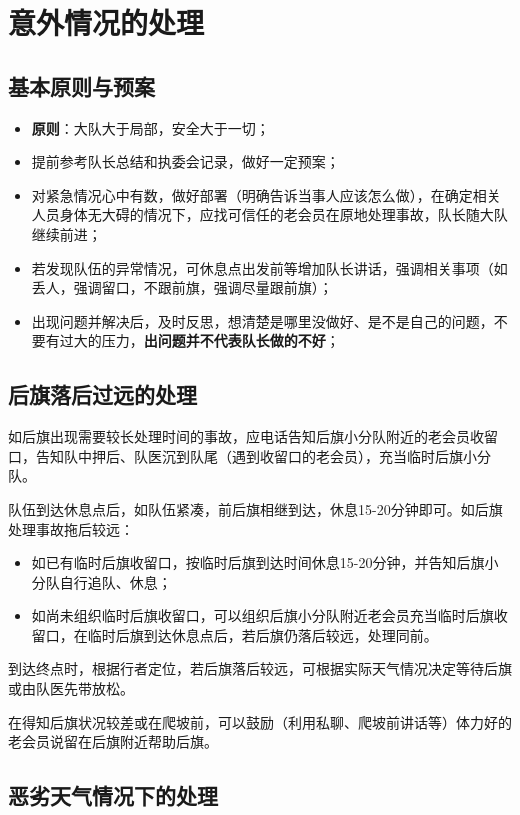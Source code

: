 \documentclass[UTF8]{ctexart}
\begin{document}
\section{意外情况的处理}


\subsection{基本原则与预案}
\begin{itemize}[nosep,left=2em]
    \item \textbf{原则}：大队大于局部，安全大于一切；
    \item 提前参考队长总结和执委会记录，做好一定预案；
    \item 对紧急情况心中有数，做好部署（明确告诉当事人应该怎么做），在确定相关人员身体无大碍的情况下，应找可信任的老会员在原地处理事故，队长随大队继续前进；
    \item 若发现队伍的异常情况，可休息点出发前等增加队长讲话，强调相关事项（如丢人，强调留口，不跟前旗，强调尽量跟前旗）；
    \item 出现问题并解决后，及时反思，想清楚是哪里没做好、是不是自己的问题，不要有过大的压力，\textbf{出问题并不代表队长做的不好}；
\end{itemize}

\subsection{后旗落后过远的处理}

如后旗出现需要较长处理时间的事故，应电话告知后旗小分队附近的老会员收留口，告知队中押后、队医沉到队尾（遇到收留口的老会员），充当临时后旗小分队。

队伍到达休息点后，如队伍紧凑，前后旗相继到达，休息15-20分钟即可。如后旗处理事故拖后较远：
\begin{itemize}[nosep,left=2em]
    \item 如已有临时后旗收留口，按临时后旗到达时间休息15-20分钟，并告知后旗小分队自行追队、休息；
    \item 如尚未组织临时后旗收留口，可以组织后旗小分队附近老会员充当临时后旗收留口，在临时后旗到达休息点后，若后旗仍落后较远，处理同前。
\end{itemize}

到达终点时，根据行者定位，若后旗落后较远，可根据实际天气情况决定等待后旗或由队医先带放松。

在得知后旗状况较差或在爬坡前，可以鼓励（利用私聊、爬坡前讲话等）体力好的老会员说留在后旗附近帮助后旗。

\subsection{恶劣天气情况下的处理}
\end{document}
